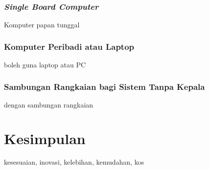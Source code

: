 \subsubsection{\textit{Single Board Computer}}
Komputer papan tunggal

\subsubsection{Komputer Peribadi atau Laptop}
boleh guna laptop atau PC

\subsubsection{Sambungan Rangkaian bagi Sistem Tanpa Kepala}
dengan sambungan rangkaian

\section{Kesimpulan}
kesesuaian, inovasi, kelebihan, kemudahan, kos
